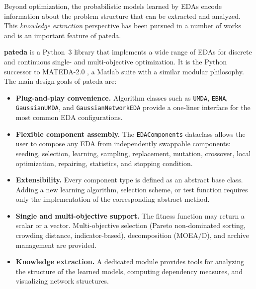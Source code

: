 \documentclass[a4paper,11pt]{article}
\begin{document}
Beyond optimization, the probabilistic models learned by EDAs encode information
about the problem structure that can be extracted and analyzed.  This
\emph{knowledge extraction} perspective has been pursued in a number of works
\citep{Echegoyen_et_al:2007,Echegoyen_et_al:2008,Hauschild_and_Pelikan:2008,Lima_et_al:2007,Santana_et_al:2007b}
and is an important feature of pateda.

\textbf{pateda} is a Python~3 library that implements a wide range of EDAs for
discrete and continuous single- and multi-objective optimization.  It is the
Python successor to MATEDA-2.0 \citep{Santana_et_al:2009b}, a Matlab suite
with a similar modular philosophy.  The main design goals of pateda are:

\begin{itemize}
  \item \textbf{Plug-and-play convenience.}  Algorithm classes such as
    \texttt{UMDA}, \texttt{EBNA}, \texttt{GaussianUMDA}, and
    \texttt{GaussianNetworkEDA} provide a one-liner interface for the most
    common EDA configurations.

  \item \textbf{Flexible component assembly.}  The \texttt{EDAComponents}
    dataclass allows the user to compose any EDA from independently swappable
    components: seeding, selection, learning, sampling, replacement, mutation,
    crossover, local optimization, repairing, statistics, and stopping condition.

  \item \textbf{Extensibility.}  Every component type is defined as an abstract
    base class.  Adding a new learning algorithm, selection scheme, or test
    function requires only the implementation of the corresponding abstract
    method.

  \item \textbf{Single and multi-objective support.}  The fitness function may
    return a scalar or a vector.  Multi-objective selection (Pareto
    non-dominated sorting, crowding distance, indicator-based), decomposition
    (MOEA/D), and archive management are provided.

  \item \textbf{Knowledge extraction.}  A dedicated module provides tools for
    analyzing the structure of the learned models, computing dependency
    measures, and visualizing network structures.
\end{itemize}
\end{document}
